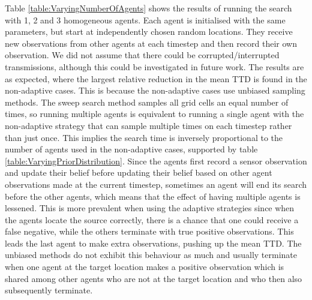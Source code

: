 Table \ref{table:VaryingNumberOfAgents} shows the results of running the search with 1, 2 and 3 homogeneous agents. Each agent is initialised with the same parameters, but start at independently chosen random locations. They receive new observations from other agents at each timestep and then record their own observation. We did not assume that there could be corrupted/interrupted transmissions, although this could be investigated in future work. The results are as expected, where the largest relative reduction in the mean TTD is found in the non-adaptive cases. This is because the non-adaptive cases use unbiased sampling methods. The sweep search method samples all grid cells an equal number of times, so running multiple agents is equivalent to running a single agent with the non-adaptive strategy that can sample multiple times on each timestep rather than just once. This implies the search time is inversely proportional to the number of agents used in the non-adaptive cases, supported by table \ref{table:VaryingPriorDistribution}. Since the agents first record a sensor observation and update their belief before updating their belief based on other agent observations made at the current timestep, sometimes an agent will end its search before the other agents, which means that the effect of having multiple agents is lessened. This is more prevalent when using the adaptive strategies since when the agents locate the source correctly, there is a chance that one could receive a false negative, while the others terminate with true positive observations. This leads the last agent to make extra observations, pushing up the mean TTD. The unbiased methods do not exhibit this behaviour as much and usually terminate when one agent at the target location makes a positive observation which is shared among other agents who are not at the target location and who then also subsequently terminate.


